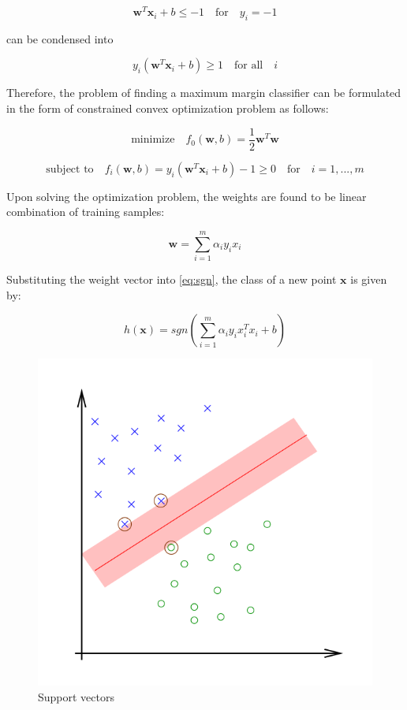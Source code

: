 $$
\mathbf{w}^{T}\mathbf{x}_i + b \leq -1 \quad \text{for} \quad y_i = -1
$$

can be condensed into 

$$
y_i (\mathbf{w}^{T}\mathbf{x}_i + b) \geq 1 \quad \text{for all} \quad i
$$

Therefore, the problem of finding a maximum margin classifier can be formulated in the form of constrained convex optimization problem as follows:

$$
\text{minimize} \quad f_0(\mathbf{w},b) = \frac{1}{2} \mathbf{w}^{T} \mathbf{w} 
$$

$$
\text{subject to} \quad f_i(\mathbf{w},b) = y_i (\mathbf{w}^{T}\mathbf{x}_i + b) -1 \geq 0 \quad \text{for} \quad i = 1,...,m
$$

Upon solving the optimization problem, the weights are found to be linear combination of training samples:

$$
\mathbf{w} = \sum^{m}_{i=1} \alpha_i y_i x_i
$$

Substituting the weight vector into \ref{eq:sgn}, the class of a new point $\mathbf{x}$ is given by:

$$
h(\mathbf{x}) = sgn(\sum^{m}_{i=1} \alpha_i y_i x_i^{T} x_i + b)
$$

\begin{figure}
\centering
\includegraphics[scale=0.4]{figures/SVMFigure3.png}
\caption{Support vectors}\label{fig:SVM3}
\end{figure}

